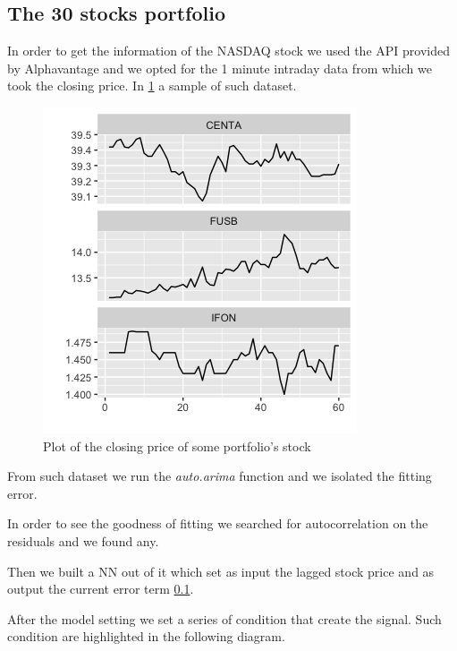 \documentclass[twocolumn]{article}
\begin{document}
\subsection{The 30 stocks portfolio}
In order to get the information of the NASDAQ stock we used the API provided by Alphavantage \cite{_alpha_} and we opted for the 1 minute intraday data from which we took the closing price. In \ref{portfolio} a sample of such dataset.

\begin{figure}
    \centering
    \includegraphics[width=1\linewidth, ]{Paper/images/Rplot.png}
    \caption{Plot of the closing price of some portfolio's stock}
    \label{portfolio}
\end{figure}

From such dataset we run the \textit{auto.arima} function and we isolated the fitting error. %

In order to see the goodness of fitting we searched for autocorrelation on the residuals and we found any.

Then we built a NN out of it which set as input the lagged stock price and as output the current error term \ref{}.

After the model setting we set a series of condition that create the signal. Such condition are highlighted in the following diagram.
\end{document}
